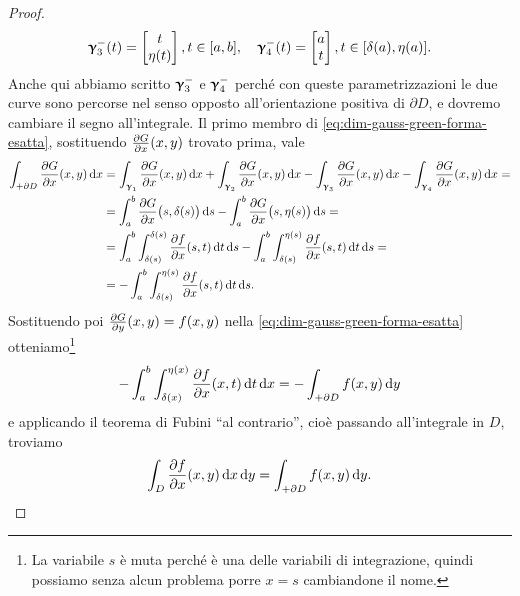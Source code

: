 \begin{proof}
\begin{gather*}
		\bm{\upgamma}_3^-(t)=
		\begin{bmatrix}
			t\\\eta(t)
		\end{bmatrix}, t\in[a,b],\quad 
		\bm{\upgamma}_4^-(t)=
		\begin{bmatrix}
			a\\t
		\end{bmatrix}, t\in[\delta(a),\eta(a)].
	\end{gather*}
	Anche qui abbiamo scritto $\bm{\upgamma}_3^-$ e $\bm{\upgamma}_4^-$ perché con queste parametrizzazioni le due curve sono percorse nel senso opposto all'orientazione positiva di $\partial D$, e dovremo cambiare il segno all'integrale.
	Il primo membro di \eqref{eq:dim-gauss-green-forma-esatta}, sostituendo $\frac{\partial {G}}{\partial {x}}(x,y)$ trovato prima, vale
	\begin{equation}
		\begin{split}
			\int_{+\partial D}\frac{\partial {G}}{\partial {x}}(x,y)\,\textup{d} x&=\int_{\bm{\upgamma}_1}\frac{\partial {G}}{\partial {x}}(x,y)\,\textup{d} x+\int_{\bm{\upgamma}_2}\frac{\partial {G}}{\partial {x}}(x,y)\,\textup{d} x-\int_{\bm{\upgamma}_3}\frac{\partial {G}}{\partial {x}}(x,y)\,\textup{d} x-\int_{\bm{\upgamma}_4}\frac{\partial {G}}{\partial {x}}(x,y)\,\textup{d} x=\\
			&=\int_a^b\frac{\partial {G}}{\partial {x}}\big(s,\delta(s)\big)\,\textup{d} s-\int_a^b\frac{\partial {G}}{\partial {x}}\big(s,\eta(s)\big)\,\textup{d} s=\\
			&=\int_a^b\int_{\delta(s)}^{\delta(s)}\frac{\partial {f}}{\partial {x}}(s,t)\,\textup{d} t\,\textup{d} s-\int_a^b\int_{\delta(s)}^{\eta(s)}\frac{\partial {f}}{\partial {x}}(s,t)\,\textup{d} t\,\textup{d} s=\\
			&=-\int_a^b\int_{\delta(s)}^{\eta(s)}\frac{\partial {f}}{\partial {x}}(s,t)\,\textup{d} t\,\textup{d} s.
		\end{split}
	\end{equation}
	Sostituendo poi $\frac{\partial {G}}{\partial {y}}(x,y)=f(x,y)$ nella \eqref{eq:dim-gauss-green-forma-esatta} otteniamo\footnote{La variabile $s$ è muta perché è una delle variabili di integrazione, quindi possiamo senza alcun problema porre $x=s$ cambiandone il nome.}
	\begin{equation}
		-\int_a^b\int_{\delta(x)}^{\eta(x)}\frac{\partial {f}}{\partial {x}}(x,t)\,\textup{d} t\,\textup{d} x=-\int_{+\partial D}f(x,y)\,\textup{d} y
	\end{equation}
	e applicando il teorema di Fubini ``al contrario'', cioè passando all'integrale in $D$, troviamo
	\begin{equation}
		\int_D\frac{\partial {f}}{\partial {x}}(x,y)\,\textup{d} x\,\textup{d} y=\int_{+\partial D}f(x,y)\,\textup{d} y.
	\end{equation}


\end{proof}
